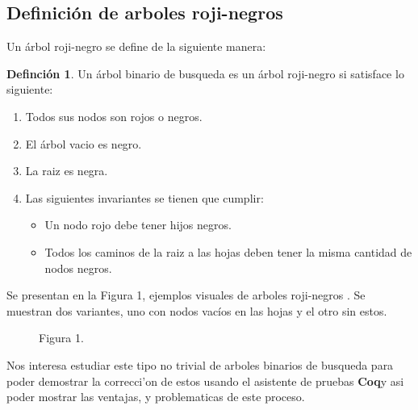 \documentclass[letterpaper,12pt,oneside]{book}
\newcommand{\coq}{\textbf{Coq}}
\newcommand{\arn}{árbol roji-negro }
\newcommand{\arns}{arboles roji-negros }
\theoremstyle{plain}
\theoremstyle{definition}
\newtheorem{defn}{Definci\'on}[section]
\theoremstyle{remark}
\begin{document}
\subsection{Definici\'on de \arns}
Un \arn se define de la siguiente manera:
\begin{defn}
Un \'arbol binario de busqueda es un \arn si satisface lo siguiente:
\begin{enumerate}
    \item Todos sus nodos son rojos o negros.
    \item El \'arbol vacio es negro.
    \item La raiz es negra.
    \item Las siguientes invariantes se tienen que cumplir:
    \begin{itemize}
        \item Un nodo rojo debe tener hijos negros.
        \item Todos los caminos de la raiz a las hojas deben tener la misma cantidad de nodos negros.
    \end{itemize}
\end{enumerate}
\end{defn}
Se presentan en la Figura 1, ejemplos visuales de \arns. Se muestran dos variantes, uno con nodos vacíos en las hojas
y el otro sin estos.

\hspace*{5cm}
\begin{figure}
\label{arbolRB}
\centering Figura 1.
\end{figure}
Nos interesa estudiar este tipo no trivial de arboles binarios de busqueda para poder
demostrar la correcci'on de estos usando el asistente de pruebas \coq y asi poder mostrar las ventajas, 
y problematicas de este proceso.
\end{document}
